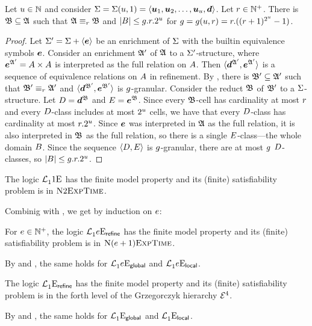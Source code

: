 \begin{remark}\label{rem:monadic-1}
Let $u \in \mathbb{N}$ and consider $\mathrm{\Sigma} = \mathrm{\Sigma}(u,1) =
\left\langle \bm{u}_{1},\bm{u}_{2},\dots,\bm{u}_{u},\bm{d} \right\rangle$. Let $r \in \mathbb{N}^{+}$.
There is $\mathfrak{B} \subseteq \mathfrak{A}$ such that $\mathfrak{A} \equiv_{r} \mathfrak{B}$ and
$\left|B\right| \leq g.r.2^u$ for $g = g(u, r) =
r.((r+1)^{2^u}-1)$.
\end{remark}
\begin{proof}
Let $\mathrm{\Sigma'} = \mathrm{\Sigma} + \left\langle \bm{e} \right\rangle$ be an enrichment of $\mathrm{\Sigma}$ with the builtin
equivalence symbols $\bm{e}$. Consider an enrichment $\mathfrak{A'}$ of $\mathfrak{A}$ to a
$\mathrm{\Sigma'}$-structure, where $\bm{e}^{\mathfrak{A'}} = {A\times A}$ is interpreted as the
full relation on $A$. Then $\langle \bm{d}^{\mathfrak{A'}}, \bm{e}^{\mathfrak{A'}} \rangle$ is a
sequence of equivalence relations on $A$ in refinement.
By , there is $\mathfrak{B'} \subseteq \mathfrak{A'}$ such that
$\mathfrak{B'} \equiv_{r} \mathfrak{A'}$ and $\langle \bm{d}^{\mathfrak{B'}},\bm{e}^{\mathfrak{B'}} \rangle$ is
$g$-granular.
Consider the reduct $\mathfrak{B}$ of $\mathfrak{B'}$ to a
$\mathrm{\Sigma}$-structure. Let $D = \bm{d}^{\mathfrak{B}}$ and $E = \bm{e}^{\mathfrak{B}}$.
Since every $\mathfrak{B}$-cell has
cardinality at most $r$ and every $D$-class includes at most $2^u$
cells, we have that every $D$-class has cardinality at most $r.2^u$.
Since $\bm{e}$ was interpreted in $\mathfrak{A}$ as the full relation, it is also
interpreted in $\mathfrak{B}$ as the full relation, so there is a single
$E$-class---the whole domain $B$.
Since the sequence $\left\langle D, E \right\rangle$ is $g$-granular, there are at most
$g$ $D$-classes, so $\left|B\right| \leq g.r.2^u$.
\end{proof}

\begin{corollary}\label{cor:monadic-base}
The logic $\mathcal{L}^{{}}_{1}{1}\mathrm{E}_{{}}$ has the finite model property and its
(finite) satisfiability problem is in $\text{\normalfont{\scshape N}}2\text{\normalfont{\scshape ExpTime}}$.
\end{corollary}

Combinig  with , we get by
induction on $e$:
\begin{proposition}\label{prop:mon-in}
For $e \in \mathbb{N}^{+}$, the logic $\mathcal{L}^{{}}_{1}{e}\mathrm{E}_{\mathsf{refine}}$ has the finite
model property and its (finite) satisfiability problem is in
$\text{\normalfont{\scshape N}}(e+1)\text{\normalfont{\scshape ExpTime}}$.

By  and , the same
holds for $\mathcal{L}^{{}}_{1}{e}\mathrm{E}_{\mathsf{global}}$ and $\mathcal{L}^{{}}_{1}{e}\mathrm{E}_{\mathsf{local}}$.
\end{proposition}
\begin{proposition}
The logic $\mathcal{L}^{{}}_{1}{{}}\mathrm{E}_{\mathsf{refine}}$ has the finite
model property and its (finite) satisfiability problem is in the forth level of
the Grzegorczyk hierarchy $\mathcal{E}^{4}$.

By  and , the same holds
for $\mathcal{L}^{{}}_{1}{{}}\mathrm{E}_{\mathsf{global}}$ and $\mathcal{L}^{{}}_{1}{{}}\mathrm{E}_{\mathsf{local}}$.
\end{proposition}

